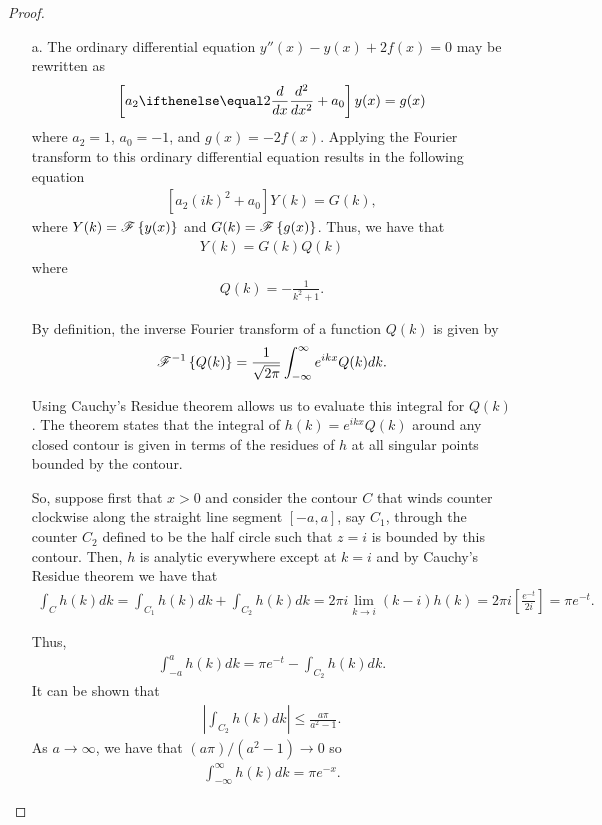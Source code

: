 \begin{proof}
  \begin{enumerate}
    \item[a.] The ordinary differential equation $y''(x) - y(x) + 2f(x) = 0$ may be rewritten
      as
      \begin{align*}
        \left[a_2 \der{x}{2} + a_0\right] y(x) = g(x)
      \end{align*}
      where $a_2 = 1$, $a_0 = -1$, and $g(x) = -2f(x)$. Applying the Fourier transform
      to this ordinary differential equation results in the following equation
      \begin{align*}
        \left[a_2(ik)^2 + a_0\right]Y(k) = G(k),
      \end{align*}
      where $Y(k) = \mathscr{F}\left\{ {y(x)} \right\}$ and $G(k) = \mathscr{F}\left\{ {g(x)} \right\}$. Thus, we have that
      \begin{align*}
        Y(k) = G(k)Q(k)
      \end{align*}
      where
      \begin{align*}
        Q(k) = -\frac{1}{k^2+1}.
      \end{align*}

      By definition, the inverse Fourier transform of a function $Q(k)$ is given by
      \begin{align*}
        \mathscr{F}^{-1}\left\{ {Q(k)} \right\} = \frac{1}{\sqrt{2\pi}} \int_{-\infty}^{\infty} e^{i k x} Q(k) dk.
      \end{align*}

      Using Cauchy's Residue theorem allows us to evaluate this integral for $Q(k)$. The theorem
      states that the integral of $h(k) = e^{i k x} Q(k)$ around any closed contour
      is given in terms of the residues of $h$ at all singular points bounded by the contour.

      So, suppose first that $x > 0$ and consider the contour $C$ that winds counter clockwise along the straight line segment $[-a, a]$, say $C_1$,
      through the counter $C_2$ defined to be the half circle such that $z = i$ is bounded by this contour. Then,
      $h$ is analytic everywhere except at $k=i$ and by Cauchy's Residue theorem we have that
      \begin{align*}
        \int_C h(k) dk = \int_{C_1} h(k) dk + \int_{C_2} h(k) dk
        = 2\pi i\lim_{k\to i} (k-i)h(k)
        = 2\pi i\left[\frac{e^{-t}}{2i}\right]
        = \pi e^{-t}.
      \end{align*}

      Thus,
      \begin{align*}
        \int_{-a}^{a} h(k) dk = \pi e^{-t} - \int_{C_2} h(k) dk.
      \end{align*}
      It can be shown that
      \begin{align*}
        \left| \int_{C_2} h(k) dk \right| \leq \frac{a \pi}{a^2 -1}.
      \end{align*}
      As $a\to \infty$, we have that $(a \pi)/(a^2 -1) \to 0$ so
      \begin{align*}
        \int_{-\infty}^{\infty} h(k) dk = \pi e^{-x}.
      \end{align*}


\end{enumerate}
\end{proof}
